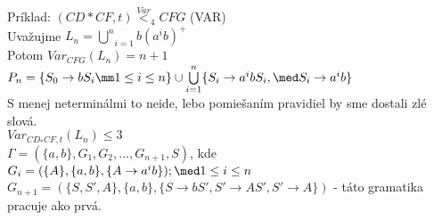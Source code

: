 \begin{dokaz}
  Príklad: $(CD*CF,t)\overset{Var}<_4 CFG$     (VAR)         \\
  Uvažujme $L_n=\underset{i=1}{\overset{n}\bigcup}b(a^ib)^+$ \\
  Potom $Var_{CFG}(L_n)=n+1$ \\
  $P_n=\{S_0 \rightarrow bS_i \mm 1\leq i \leq n\} \cup
  \underset{i=1}{\overset{n}\bigcup} \{S_i\rightarrow a^ibS_i,\med S_i\rightarrow a^ib\}$ \\
  S menej neterminálmi to neide, lebo pomiešaním pravidiel by sme dostali zlé slová. \\
  $Var_{CD_*CF,t}(L_n)\leq 3$ \\
  $\Gamma = (\{a,b\}, G_1,G_2,...,G_{n+1},S)$, kde \\
  $G_i=(\{A\},\{a,b\},\{A\rightarrow a^ib\});\med 1\leq i \leq n$ \\
  $G_{n+1}=(\{S,S',A\},\{a,b\},\{S\rightarrow bS',S'\rightarrow AS',S'\rightarrow A\})$ -
  táto gramatika pracuje ako prvá.
\end{dokaz}
